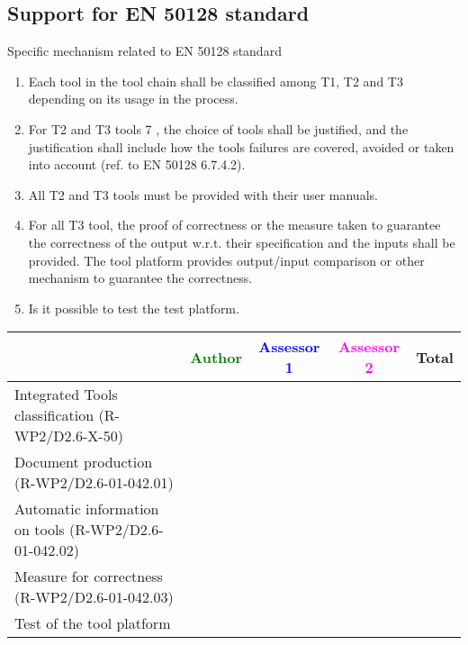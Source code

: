 \subsection{Support for EN 50128 standard}
Specific mechanism related to EN 50128 standard
\begin{enumerate}
\item  Each tool in the tool chain shall be classified among T1, T2
  and T3 depending on its usage in the process.
\item  For T2 and T3 tools 7 , the choice of tools shall be justified,
  and the justification shall include how the tools failures are
  covered, avoided or taken into account (ref. to EN 50128 6.7.4.2).
\item  All T2 and T3 tools must be provided with their user manuals.
\item  For all T3 tool, the proof of correctness or the measure taken
  to guarantee the correctness of the output w.r.t. their
  specification and the inputs shall be provided. The tool platform
  provides output/input comparison  or other mechanism to guarantee
  the correctness.
\item Is it possible to test the test platform.
\end{enumerate}

\begin{tabular}{|l | c | c | c | c|} \hline
  & \textcolor{green}{Author} & \textcolor{blue}{Assessor 1} &  \textcolor{magenta}{Assessor 2} & Total \\
  \hline Integrated Tools classification (R-WP2/D2.6-X-50)  &
  &                 &                  &\\
  \hline Document production (R-WP2/D2.6-01-042.01) &
  &                 &                  &\\
  \hline Automatic information on tools (R-WP2/D2.6-01-042.02) &
  &                 &                  &\\
  \hline Measure for correctness (R-WP2/D2.6-01-042.03) &
  &                 &                  &\\
  \hline Test of the tool platform &
  &                 &                  &\\
  \hline
\end{tabular}

